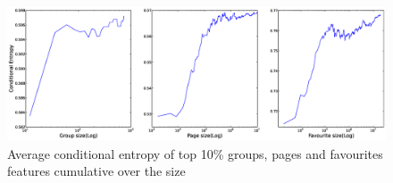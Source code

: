 \begin{figure}[tbp!]
\centering
\includegraphics[width=160mm,height=40mm]{data/plots/cumulativeEntropy/cumulative.eps}
\caption{Average conditional entropy of top 10\% groups, pages and favourites features cumulative over the size }
\label{Fig4}
\end{figure}


